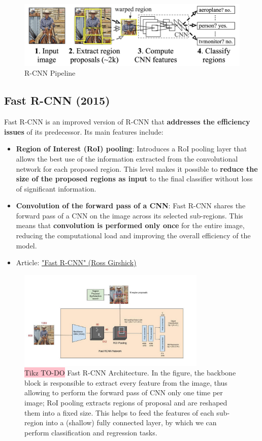 \begin{figure}[!htbp]
    \centering
    \includegraphics[width=0.9\linewidth]{tikz/chapter5 - R-CNN.png}
    \caption{R-CNN Pipeline}
\end{figure}

\subsection{Fast R-CNN (2015)}
Fast R-CNN is an improved version of R-CNN that \textbf{addresses the efficiency issues} of its predecessor. Its main features include:

\begin{itemize}
    \item \textbf{Region of Interest (RoI) pooling}: Introduces a RoI pooling layer that allows the best use of the information extracted from the convolutional network for each proposed region. This level makes it possible to \textbf{reduce the size of the proposed regions as input} to the final classifier without loss of significant information.
    \item \textbf{Convolution of the forward pass of a CNN}: Fast R-CNN shares the forward pass of a CNN on the image across its selected sub-regions. This means that \textbf{convolution is performed only once} for the entire image, reducing the computational load and improving the overall efficiency of the model.
    \item Article: \href{https://arxiv.org/pdf/1504.08083.pdf}{"Fast R-CNN" (Ross Girshick)}
\end{itemize}

\begin{figure}[!htbp]
    \centering
    \includegraphics[width=0.8\textwidth]{tikz/chapter5 - Fast R-CNN.jpeg}
    \caption{{\color{red}\colorbox{pink}{Tikz TO-DO}} Fast R-CNN Architecture. In the figure, the backbone block is responsible to extract every feature from the image, thus allowing to perform the forward pass of CNN only one time per image; RoI pooling extracts regions of proposal and are reshaped them into a fixed size. This helps to feed the features of each sub-region into a (shallow) fully connected layer,  by which we can perform classification and regression tasks.   }
\end{figure}


